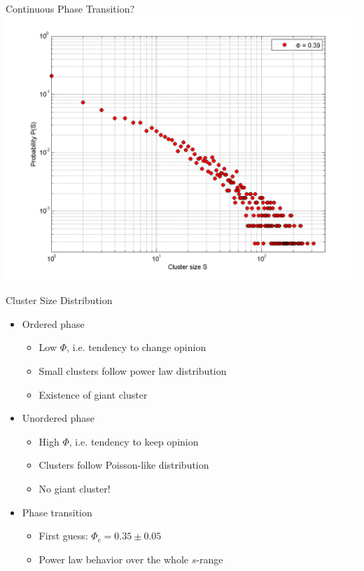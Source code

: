 \documentclass[xcolor=x11names,compress]{beamer}
\renewcommand{\(}{\begin{columns}}
\renewcommand{\)}{\end{columns}}
\newcommand{\<}[1]{\begin{column}{#1}}
\renewcommand{\>}{\end{column}}
\begin{document}

\begin{frame}{Continuous Phase Transition?}
\includegraphics[scale=0.5]{Graphics/ClustersizeDistr/31.png}
\end{frame}


\begin{frame}{Cluster Size Distribution}
\begin{itemize}
\item Ordered phase
\begin{itemize}
\item Low $\Phi$, i.e. tendency to change opinion
\item Small clusters follow power law distribution
\item Existence of giant cluster
\end{itemize}
\item Unordered phase
\begin{itemize}
\item High $\Phi$, i.e. tendency to keep opinion
\item Clusters follow Poisson-like distribution
\item No giant cluster!
\end{itemize}
\item Phase transition
\begin{itemize}
\item First guess: $\Phi_c = 0.35 \pm 0.05$
\item Power law behavior over the whole $s$-range
\end{itemize}
\end{itemize}
\end{frame}
\end{document}
